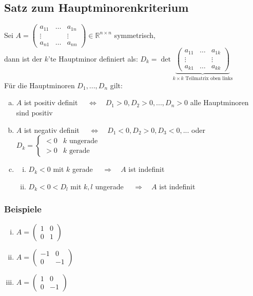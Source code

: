 \documentclass[11pt,a4paper]{book}
\newcommand {\Rnxn}	{\mathbb{R}^{n \times n}}
\newcommand{\1}    	{\mathbbm{1}}
\begin{document}
\subsection{Satz zum Hauptminorenkriterium}
Sei \(A = \left( \begin{array}{ccc}
		a_{11} & \hdots & a_{1n} \\
		\vdots & & \vdots \\
		a_{n1} & \hdots & a_{nn}
	\end{array} \right) \in \Rnxn\) symmetrisch,\\ 
	dann ist der \(k\)'te Hauptminor definiert als:
\(
	D_k = \det \underbrace{\left( \begin{array}{ccc}
		a_{11} & \hdots & a_{1k} \\
		\vdots & & \vdots \\
		a_{k1} & \hdots & a_{kk}
	\end{array} \right)}_{k \times k \textrm{ Teilmatrix oben links}}
\)\\
Für die Hauptminoren \(D_1, ..., D_n\) gilt:
\begin{enumerate}[a.~]
	\item \(A\) ist positiv definit \(\quad\Leftrightarrow\quad D_1 > 0, D_2 > 0, ..., D_n > 0\) alle Hauptminoren sind positiv
	\item \(A\) ist negativ definit \(\quad\Leftrightarrow\quad D_1 < 0, D_2 > 0, D_3 < 0, ...\) oder \( D_k = \left\{ \begin{array}{ll}
		< 0 & k \textrm{ ungerade} \\
		> 0 & k \textrm{ gerade}	
	\end{array} \right. \)
	\item \begin{enumerate}[(i)]
		\item \(D_k < 0\) mit \(k\) gerade \(\quad\Rightarrow\quad A\) ist indefinit
		\item \(D_k < 0 < D_l\) mit \(k,l\) ungerade \(\quad\Rightarrow\quad A\) ist indefinit
	\end{enumerate}
\end{enumerate}

\subsubsection*{Beispiele}
\begin{enumerate}[(i)]
	\item \(A = \left( \begin{array}{cc}
		1 & 0 \\
		0 & 1
	\end{array} \right) \)
	\item \(A = \left( \begin{array}{cc}
		-1 & 0 \\
		0 & -1
	\end{array} \right) \)
	\item \(A = \left( \begin{array}{cc}
		1 & 0 \\
		0 & -1
	\end{array} \right) \)
\end{enumerate}
\end{document}
